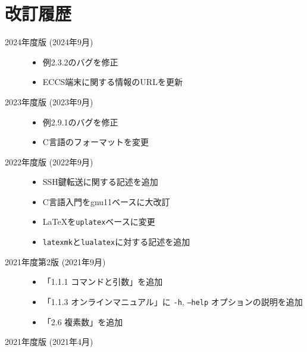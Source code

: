 \section*{改訂履歴}

\noindent
\begin{description}
    \item [2024年度版 (2024年9月)] \mbox{}

       \begin{itemize}
           \item 例2.3.2のバグを修正
           \item ECCS端末に関する情報のURLを更新
       \end{itemize}


    \item [2023年度版 (2023年9月)] \mbox{}

       \begin{itemize}
           \item 例2.9.1のバグを修正
           \item C言語のフォーマットを変更
       \end{itemize}


    \item [2022年度版 (2022年9月)] \mbox{}

          \begin{itemize}
              \item SSH鍵転送に関する記述を追加
              \item C言語入門をgnu11ベースに大改訂
              \item \LaTeX を\texttt{uplatex}ベースに変更
              \item \texttt{latexmk}と\texttt{lualatex}に対する記述を追加
          \end{itemize}

    \item[2021年度第2版 (2021年9月)] \mbox{}

          \begin{itemize}
              \item 「1.1.1 コマンドと引数」を追加
              \item 「1.1.3 オンラインマニュアル」に \texttt{-h}, \texttt{--help} オプションの説明を追加
              \item 「2.6 複素数」を追加
          \end{itemize}

    \item[2021年度版 (2021年4月)] \mbox{}


\end{description}
